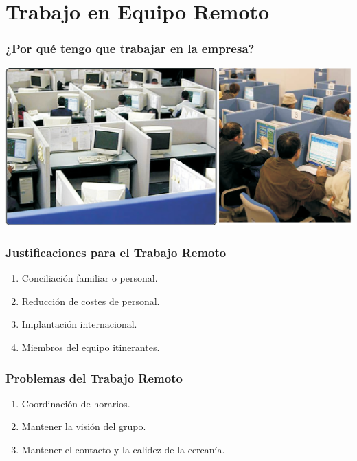 \documentclass[a4paper,slidestop,xcolor=pst,dvips,blue]{beamer}
\begin{document}
\section{Trabajo en Equipo Remoto}

\begin{frame}[c]
	\frametitle{¿Por qué tengo que trabajar en la empresa?}
	\begin{center}
\includegraphics[width=\linewidth,keepaspectratio=true]{images/realidad.eps}
	\end{center}
\end{frame}

\begin{frame}[c]
	\frametitle{Justificaciones para el Trabajo Remoto}
	\begin{enumerate}[<+->]
        \item Conciliación familiar o personal.
        \item Reducción de costes de personal.
        \item Implantación internacional.
        \item Miembros del equipo itinerantes.
	\end{enumerate}
\end{frame}

\begin{frame}[c]
	\frametitle{Problemas del Trabajo Remoto}
	\begin{enumerate}[<+->]
        \item Coordinación de horarios.
        \item Mantener la visión del grupo.
        \item Mantener el contacto y la calidez de la cercanía.
	\end{enumerate}
\end{frame}
\end{document}
